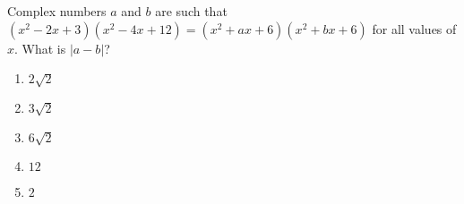 Complex numbers $a$ and $b$ are such that $(x^{2}-2x+3)(x^{2}-4x+12)=(x^{2}+ax+6)(x^{2}+bx+6)$ for all values of $x$. What is $|a-b|$?
\begin{enumerate}
\item $2\sqrt{2}$
\item $3\sqrt{2}$
\item $6\sqrt{2}$
\item $12$
\item $2$
\end{enumerate}
